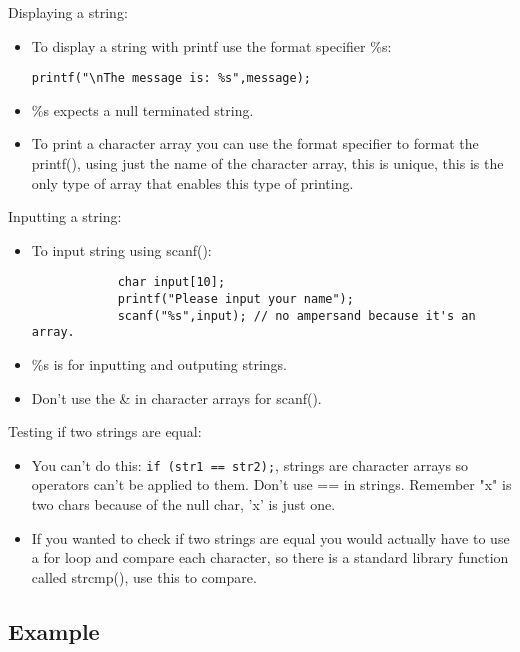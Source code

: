 Displaying a string: 
\begin{itemize}
    \item To display a string with printf use the format specifier \%s: 
    \begin{Verbatim}[breaklines=true, breakanywhere=true]
        printf("\nThe message is: %s",message);
    \end{Verbatim}
    
    \item \%s expects a null terminated string. 
    \item To print a character array you can use the format specifier to format the printf(), using just the name of the character array, this is unique, this is the only type of array that enables this type of printing. 
\end{itemize}
Inputting a string: 
\begin{itemize}
    \item To input string using scanf():
        \begin{verbatim}
            char input[10]; 
            printf("Please input your name");
            scanf("%s",input); // no ampersand because it's an array. 
        \end{verbatim}
    
    \item \%s is for inputting and outputing strings. 
    \item Don't use the \& in character arrays for scanf().
\end{itemize}
Testing if two strings are equal: 
\begin{itemize}
    \item You can't do this: \texttt{if (str1 == str2);}, strings are character arrays so operators can't be applied to them. Don't use == in strings. Remember "x" is two chars because of the null char, 'x' is just one. 
    \item If you wanted to check if two strings are equal you would actually have to use a for loop and compare each character, so there is a standard library function called strcmp(), use this to compare.
\end{itemize}

\subsection{Example}


